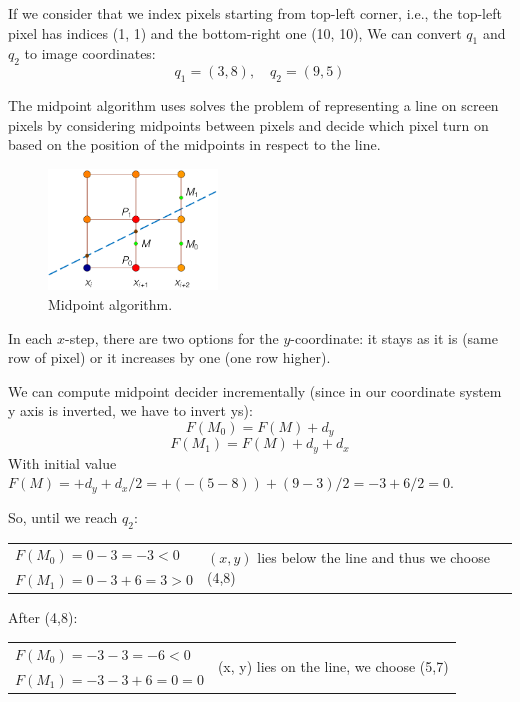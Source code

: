 \documentclass[tikz,14pt,fleqn]{article}
\begin{document}
If we consider that we index pixels starting from top-left corner, i.e.,
the top-left pixel has indices (1, 1) and the bottom-right one (10, 10), We can convert $q_1$ and $q_2$ to image coordinates:
\[
q_1 = (3,8), \quad
q_2 = (9,5)
\]

The midpoint algorithm uses solves the problem of representing a line on screen pixels by considering midpoints between pixels and decide which pixel turn on based on the position of the midpoints in respect to the line.

\begin{figure}[h!]
    \centering
    \includegraphics[width=0.4\textwidth]{fig/midpoint_alg.png}
    \caption{Midpoint algorithm.}
    \label{fig:midpoint}
\end{figure}
In each $x$-step, there are two options for the $y$-coordinate: it stays as it is (same row of pixel) or it increases by one (one row higher).

We can compute midpoint decider incrementally (since in our coordinate system y axis is inverted, we  have to invert ys):
\[
F(M_0) = F(M) +d_y
\]
\[
F(M_1) = F(M) +d_y + d_x
\]
With initial value $F(M) = +d_y + d_x/2 = +(-(5-8)) + (9-3)/2 = -3+6/2 = 0$.

So, until we reach $q_2$:

\begin{tabular}{ll}
    $F(M_0) = 0 -3 = -3 < 0$ &  \multirow{2}{*}{$(x, y)$ lies below the line and thus we choose (4,8)}\\
    $F(M_1) = 0 -3 + 6= 3 > 0$ & 
\end{tabular}

After (4,8):

\begin{tabular}{ll}
    $F(M_0) = -3 -3 = -6 < 0$ &  \multirow{2}{*}{(x, y) lies on the line, we choose (5,7)}\\
    $F(M_1) = -3 -3 + 6= 0 = 0$ & 
\end{tabular}

\end{document}
